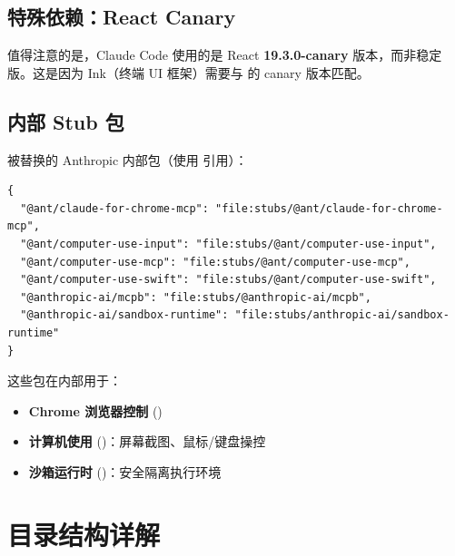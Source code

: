 \subsection{特殊依赖：React Canary}

值得注意的是，Claude Code 使用的是 React \textbf{19.3.0-canary} 版本，而非稳定版。这是因为 Ink（终端 UI 框架）需要与  的 canary 版本匹配。

\subsection{内部 Stub 包}

被替换的 Anthropic 内部包（使用  引用）：

\begin{lstlisting}[breaklines=true]
{
  "@ant/claude-for-chrome-mcp": "file:stubs/@ant/claude-for-chrome-mcp",
  "@ant/computer-use-input": "file:stubs/@ant/computer-use-input",
  "@ant/computer-use-mcp": "file:stubs/@ant/computer-use-mcp",
  "@ant/computer-use-swift": "file:stubs/@ant/computer-use-swift",
  "@anthropic-ai/mcpb": "file:stubs/@anthropic-ai/mcpb",
  "@anthropic-ai/sandbox-runtime": "file:stubs/anthropic-ai/sandbox-runtime"
}
\end{lstlisting}

这些包在内部用于：
\begin{itemize}[nosep]
  \item \textbf{Chrome 浏览器控制} ()
  \item \textbf{计算机使用} ()：屏幕截图、鼠标/键盘操控
  \item \textbf{沙箱运行时} ()：安全隔离执行环境
\end{itemize}

\section{目录结构详解}

